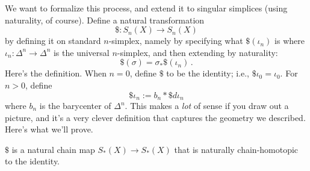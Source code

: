 We want to formalize this process, and extend it to singular simplices (using
naturality, of course). Define a natural transformation 
\[
\$:S_n(X)\to S_n(X)
\]
 by defining it on standard $n$-simplex, namely by specifying what $\$(\iota_n)$ is where $\iota_n:\Delta^n\rightarrow\Delta^n$ is the universal $n$-simplex, and then extending by naturality:
\[
\$(\sigma)=\sigma_\ast\$(\iota_n)\,.
\]
Here's the definition. When $n=0$, define $\$$ to be the identity; i.e., $\$\iota_0=\iota_0$. For $n>0$, define 
\[
\$\iota_n:=b_n\ast\$ d\iota_n
\]
where $b_n$ is the barycenter of $\Delta^n$. This makes a \emph{lot} of sense if you draw out a picture, and it's a very clever definition that captures the geometry we described. Here's what we'll prove.
\begin{prop}
$\$$ is a natural chain map $S_\ast(X)\to S_\ast(X)$ that is naturally chain-homotopic to the identity. 
\end{prop}

